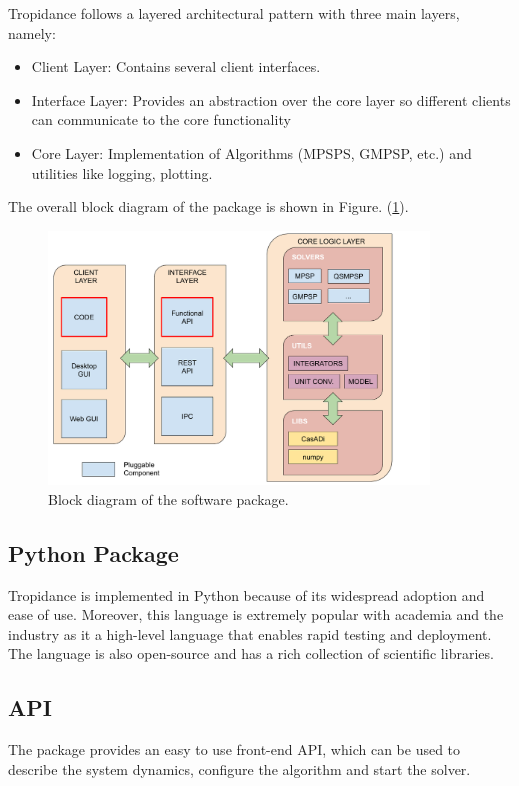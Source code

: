 \documentclass[12pt]{article}
\let\oldref\ref
\renewcommand{\ref}[1]{(\oldref{#1})}
\begin{document}
Tropidance follows a layered architectural pattern with three main layers, namely: 

\begin{itemize}
    \item Client Layer: Contains several client interfaces.
    \item Interface Layer: Provides an abstraction over the core layer so different clients can communicate to the core functionality
    \item Core Layer: Implementation of Algorithms (MPSPS, GMPSP, etc.) and utilities like logging, plotting.
\end{itemize}


The overall block diagram of the package is shown in Figure. \ref{fig:SoftwarePacakgeFlow}.

\begin{figure}[h]
    \centering
    \includegraphics[width=0.9\textwidth]{img/OverallCodeStructure.png}
    \caption{Block diagram of the software package.}
    \label{fig:SoftwarePacakgeFlow}
\end{figure}

\subsection{Python Package}
Tropidance is implemented in Python because of its widespread adoption and ease of use. Moreover, this language is extremely popular with academia and the industry as it a high-level language that enables rapid testing and deployment. The language is also open-source and has a rich collection of scientific libraries.

\subsection{API}
The package provides an easy to use front-end API, which can be used to describe the system dynamics, configure the algorithm and start the solver.
\end{document}
